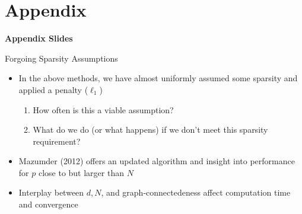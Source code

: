 \documentclass{beamer}
\begin{document}

\section*{Appendix}

\begin{frame}{}
\bf{\LARGE Appendix Slides}    
\end{frame}


\begin{frame}{Forgoing Sparsity Assumptions}
\begin{itemize}
\item In the above methods, we have almost uniformly assumed some sparsity and applied a penalty ($\ell_1$)
    \begin{enumerate}
        \item How often is this a viable assumption? 
        \item What do we do (or what happens) if we don't meet this sparsity requirement? 
    \end{enumerate}
\item     Mazumder (2012) \cite{mazumder_graphical_2012} offers an updated algorithm and insight into performance for $p$ close to but larger than $N$
\item Interplay between $d, N$, and graph-connectedeness affect computation time and convergence 
\end{itemize}
\end{frame}
\end{document}
